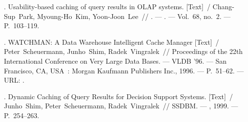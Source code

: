 \documentclass{cmi}
\begin{document}
\begin{biblio_lat}
	. Usability-based caching of query results in OLAP
	systems. [Text]~/ Chang-Sup~Park, Myoung-Ho~Kim, Yoon-Joon~Lee~//
	. ---
	. ---
	\newblock Vol.~68, no.~2. ---
	\newblock P.~103--119.
	
	. WATCHMAN: A Data Warehouse Intelligent Cache
	Manager [Text]~/ Peter~Scheuermann, Junho~Shim, Radek~Vingralek~//
	Proceedings of the 22th International Conference on Very Large Data Bases.
	---
	\newblock VLDB '96. ---
	\newblock San Francisco, CA, USA~: Morgan Kaufmann Publishers Inc., 1996. ---
	\newblock P.~51--62. ---
	\newblock URL: .
	
	. Dynamic Caching of Query Results for Decision Support
	Systems. [Text]~/ Junho~Shim, Peter~Scheuermann, Radek~Vingralek~// SSDBM.
	---
	\newblock [S.\ l.~: s.\ n.], 1999. ---
	\newblock P.~254--263.
\end{biblio_lat}

\end{document}
